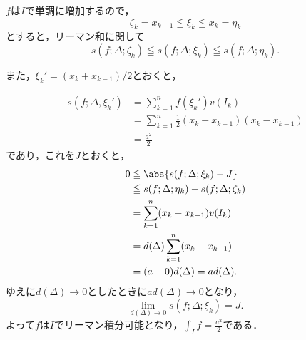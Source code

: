 \documentclass[a4paper,10pt,fleqn]{ltjsarticle}
\begin{document}
\begin{tleftbar}
    $f$は$I$で単調に増加するので，
    \[
        \zeta_k = x_{k-1} \leqq \xi_k \leqq x_k=\eta_k
    \]
    とすると，リーマン和に関して
    \[
        s(f;\Delta ; \zeta_k ) \leqq s(f;\Delta;\xi_k) \leqq s(f;\Delta;\eta_k).
    \]

    また，$\xi_k' = (x_k+x_{k-1} )/2 $とおくと，

    \begin{align*}
        s(f;\Delta,\xi_k' ) & = \sum_{k=1}^{n} f(\xi_k ') v(I_k)                          \\
                            & =  \sum_{k=1}^{n} \frac{1}{2} (x_k +x_{k-1})(x_k - x_{k-1}) \\
                            & = \frac{a^2}{2}
    \end{align*}
    であり，これを$J$とおくと，
    \begin{align*}
        0 & \leqq \abs{s(f;\Delta; \xi_k)-J }                 \\
          & \leqq  s(f;\Delta;\eta_k) -s(f;\Delta ; \zeta_k ) \\
          & = \sum_{k=1}^{n} (x_k-x_{k-1} ) v(I_k)            \\
          & = d(\Delta) \sum_{k=1}^{n} (x_k-x_{k-1} )         \\
          & = (a-0) d(\Delta)=a d(\Delta).
    \end{align*}
    ゆえに$d (\Delta) \to 0$としたときに$a d(\Delta) \to 0$となり，
    \[
        \lim_{d(\Delta) \to 0} s(f;\Delta; \xi_k)=J.
    \]
    よって$f$は$I$でリーマン積分可能となり，$\int_{I} f = \frac{a^2}{2}$である．
\end{tleftbar}
\end{document}
